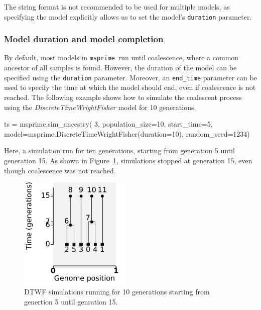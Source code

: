 \documentclass[graybox]{svmult}
\newcommand{\msprime}[0]{\texttt{msprime}}
\begin{document}
The string format is not recommended to be used for multiple models, as specifying the model explicitly allows us to set the model's \texttt{duration}
parameter.

\subsubsection{Model duration and model completion}\label{model-duration-and-model-completion}

By default, most models in \msprime\ run until coalescence, where a common ancestor of all samples is found. However, the duration of the model can be specified
using the \texttt{duration} parameter. Moreover, an \texttt{end\_time} parameter can be used to specify the time at which the model should end, even if coalescence
is not reached. The following example shows how to simulate the coalescent process using the \emph{DiscreteTimeWrightFisher} model for 10 generations.

\begin{pythoncode}

ts = msprime.sim_ancestry(
    3,
    population_size=10,
    start_time=5,
    model=msprime.DiscreteTimeWrightFisher(duration=10),
    random_seed=1234)
\end{pythoncode}

Here, a simulation run for ten generations, starting from generation 5 until generation 15. As shown in Figure~\ref{fig:start-duration}, simulations stopped
at generation 15, even though coalescence was not reached.

\begin{figure}
\begin{center}
\includegraphics[width=0.48\textwidth]{images/model-duration-and-model-completion.pdf}
\end{center}
\caption{\label{fig:start-duration} DTWF simulations running for 10 generations starting from genertion 5 until genration 15.}
\end{figure}
\end{document}

